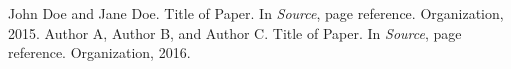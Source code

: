 \documentclass{article}
\begin{document}
	
	
	\begin{thebibliography}{1}
		
	 	John Doe and Jane Doe.
	 	\newblock Title of Paper.
	 	\newblock In {\em Source}, page reference. Organization, 2015.
	 	Author A, Author B, and Author C.
	 	\newblock Title of Paper.
	 	\newblock In {\em Source}, page reference. Organization, 2016.
		
	\end{thebibliography}
	
	
\end{document}
